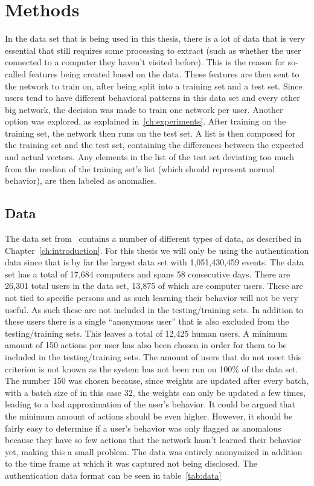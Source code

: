 \chapter{Methods}\label{ch:methods}

In the data set that is being used in this thesis, there is a lot of data that is very essential that still requires some processing to extract (such as whether the user connected to a computer they haven't visited before). This is the reason for so-called features being created based on the data. These features are then sent to the network to train on, after being split into a training set and a test set. Since users tend to have different behavioral patterns in this data set and every other big network, the decision was made to train one network per user. Another option was explored, as explained in~\ref{ch:experiments}. After training on the training set, the network then runs on the test set. A list is then composed for the training set and the test set, containing the differences between the expected and actual vectors. Any elements in the list of the test set deviating too much from the median of the training set's list (which should represent normal behavior), are then labeled as anomalies.

\section{Data}
The data set from~\cite{akent-2015-enterprise-data} contains a number of different types of data, as described in Chapter~\ref{ch:introduction}. For this thesis we will only be using the authentication data since that is by far the largest data set with 1,051,430,459 events. The data set has a total of 17,684 computers and spans 58 consecutive days. There are 26,301 total users in the data set, 13,875 of which are computer users. These are not tied to specific persons and as such learning their behavior will not be very useful. As such these are not included in the testing/training sets. In addition to these users there is a single \enquote{anonymous user} that is also excluded from the testing/training sets. This leaves a total of 12,425 human users. A minimum amount of 150 actions per user has also been chosen in order for them to be included in the testing/training sets. The amount of users that do not meet this criterion is not known as the system has not been run on 100\% of the data set. The number 150 was chosen because, since weights are updated after every batch, with a batch size of in this case 32, the weights can only be updated a few times, leading to a bad approximation of the user's behavior. It could be argued that the minimum amount of actions should be even higher. However, it should be fairly easy to determine if a user's behavior was only flagged as anomalous because they have so few actions that the network hasn't learned their behavior yet, making this a small problem. The data was entirely anonymized in addition to the time frame at which it was captured not being disclosed. The authentication data format can be seen in table~\ref{tab:data}

